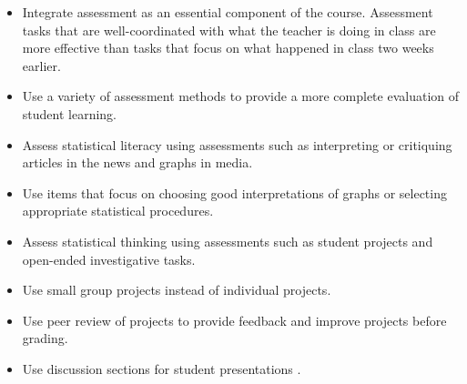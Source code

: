 \begin{itemize}[leftmargin=1cm, itemsep=.2em]
\item Integrate assessment as an essential component of the course. Assessment tasks that are well-coordinated with what the teacher is doing in class are more effective than tasks that focus on what happened in class two weeks earlier.
\item Use a variety of assessment methods to provide a more complete evaluation of student learning.
\item Assess statistical literacy using assessments such as interpreting or critiquing articles in the news and graphs in media.
\item Use items that focus on choosing good interpretations of graphs or selecting appropriate statistical procedures.
\item Assess statistical thinking using assessments such as student projects and open-ended investigative tasks.
\end{itemize}
 
 \vspace{.2in}
\noindent{}
\begin{itemize}[leftmargin=1cm, itemsep=.2em]
\item Use small group projects instead of individual projects.
\item Use peer review of projects to provide feedback and improve projects before grading.
\item Use discussion sections for student presentations .
\end{itemize}


